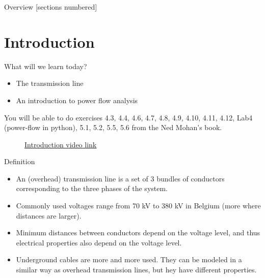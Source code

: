 \titleframe

\begin{frame}{Overview}
  [sections numbered]
  \tableofcontents[hideallsubsections]
\end{frame}

\section{Introduction}

\begin{frame}{What will we learn today?}
    \small
    \begin{itemize}
        \item The transmission line
        \item An introduction to power flow analysis
    \end{itemize}
    You will be able to do exercises 4.3, 4.4, 4.6, 4.7, 4.8, 4.9, 4.10, 4.11, 4.12, Lab4 (power-flow in python), 5.1, 5.2, 5.5, 5.6 from the Ned Mohan's book.
\end{frame}

\begin{frame}
    \begin{figure}
        \centering
        \href{https://www.youtube.com/embed/R_Z-A9KZr58}{\underline{Introduction video link}}
    \end{figure}
\end{frame}

\begin{frame}{Definition}
    \begin{itemize}
        \item An (overhead) transmission line is a set of 3 bundles of conductors corresponding to the three phases of the system.
        \item Commonly used voltages range from 70 kV to 380 kV in Belgium (more where distances are larger).
        \item Minimum distances between conductors depend on the voltage level, and thus electrical properties also depend on the voltage level.
        \item Underground cables are more and more used. They can be modeled in a similar way as overhead transmission lines, but hey have different properties.
    \end{itemize}
\end{frame}

